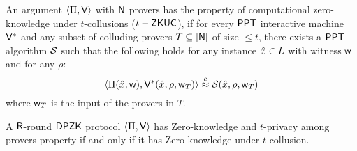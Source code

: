 \begin{definition}
	\begin{comment} 
<<<<<<< HEAD
	Let $\innp{ \Pi ( \wit )}{ \verifier( \stmt )}$ be an interactive $\DPZK$ protocol , with $\Num$ provers, for some language $L$. Where each messages of $\Pi$ is generated by the provers $\prover_1, \ldots, \prover_{\Num}$. Then $\innp{ \Pi ( \wit )}{ \verifier( \stmt )}$ has computational zero-knowledge under $t$-collusion ($t-ZKUC$) property if for every $\ppt$ interactive machine $\verifier^*$ and any subset $T\subseteq [\Num]$ of size $\leq t$, who is colluding with $t$-provers, $\exists$ a $\ppt$ algorithm $\Sim$ such that the following holds: 
	$$ \{ \innp{\Pi(\wit)}{\verifier^*(z, \wit_T)} \}( \stmt)  \stackrel{c}{\approx} \{ \langle \Sim \rangle (\stmt, z, \wit_T) \} $$
	where $\stmt \in L, \wit \in R_x, z\in \bitset^*$ and $\wit_T$ is the input of the provers in $T$. 
=======
\end{comment}

An argument $\langle \Pi,\mathsf{V}\rangle$ with $\mathsf{N}$ provers has the property of computational zero-knowledge under $t$-collusions ($t-\mathsf{ZKUC}$), if for every $\mathsf{PPT}$ interactive machine $\mathsf{V}^*$ and any subset of colluding provers $T\subseteq [\mathsf{N}]$ of size $\leq t$, there exists a $\mathsf{PPT}$ algorithm $\mathcal{S}$ such that the following holds for any instance $\hat{x} \in L$ with witness $\mathsf{w}$ and for any $\rho$: 
\[
\langle \Pi(\hat{x}, \mathsf{w}),\mathsf{V}^*(\hat{x}, \rho, \mathsf{w}_T)\rangle  \stackrel{c}{\approx}  \mathcal{S} (\hat{x}, \rho, \mathsf{w}_T)
\]
where $\mathsf{w}_T$ is the input of the provers in $T$. 

\end{definition}

\begin{theorem}\label{theo:equivalent}
	A $\mathsf{R}$-round $\mathsf{DPZK}$ protocol $\langle \Pi,\mathsf{V}\rangle$ has Zero-knowledge and $t$-privacy among provers property if and only if it has Zero-knowledge under $t$-collusion.
\end{theorem}

